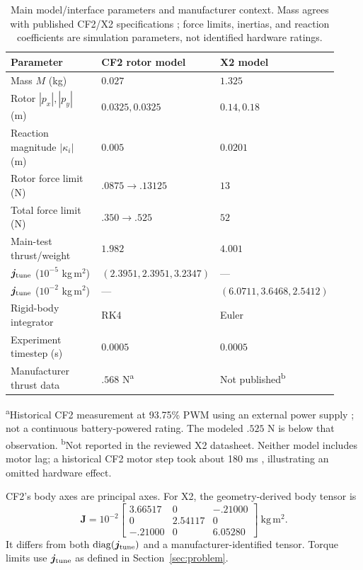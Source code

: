 \documentclass[letterpaper, 10 pt, conference]{ieeeconf}
\begin{document}
\begin{table}[t]
\centering
\caption{Main model/interface parameters and manufacturer context.
Mass agrees with published CF2/X2 specifications \cite{bitcrazeCF20Specs,skydioX2ESpecs}; force limits, inertias, and reaction coefficients are simulation parameters, not identified hardware ratings.}
\label{tab:models}
\setlength{\tabcolsep}{3pt}
\footnotesize
\begin{tabular}{@{}p{0.40\linewidth}p{0.27\linewidth}p{0.25\linewidth}@{}}
\toprule
Parameter & CF2 rotor model & X2 model\\
\midrule
Mass $M$ (kg) & $0.027$ & $1.325$\\
Rotor $|p_x|,|p_y|$ (m) & $0.0325,0.0325$ & $0.14,0.18$\\
Reaction magnitude $|\kappa_i|$ (m) & $0.005$ & $0.0201$\\
Rotor force limit (N) & $.0875\to.13125$ & $13$\\
Total force limit (N) & $.350\to.525$ & $52$\\
Main-test thrust/weight & $1.982$ & $4.001$\\
$\bm j_{\rm tune}$ ($10^{-5}$ kg\,m$^2$) & $(2.3951,\allowbreak2.3951,\allowbreak3.2347)$ & ---\\
$\bm j_{\rm tune}$ ($10^{-2}$ kg\,m$^2$) & --- & $(6.0711,\allowbreak3.6468,\allowbreak2.5412)$\\
Rigid-body integrator & RK4 & Euler\\
Experiment timestep (s) & $0.0005$ & $0.0005$\\
Manufacturer thrust data & $.568$ N\textsuperscript{a} & Not published\textsuperscript{b}\\
\bottomrule
\end{tabular}
\par\smallskip
\begin{minipage}{0.97\linewidth}
\scriptsize
\textsuperscript{a}Historical CF2 measurement at 93.75\% PWM using an external power supply \cite{bitcrazeThrustMeasurements}; not a continuous battery-powered rating. The modeled $.525$ N is below that observation.
\textsuperscript{b}Not reported in the reviewed X2 datasheet. Neither model includes motor lag; a historical CF2 motor step took about 180 ms \cite{bitcrazeMotorResponse}, illustrating an omitted hardware effect.
\end{minipage}
\end{table}

CF2's body axes are principal axes. For X2, the geometry-derived body tensor is
\[
 \bm J=10^{-2}\begin{bmatrix}3.66517&0&-.21000\\0&2.54117&0\\-.21000&0&6.05280\end{bmatrix}
 \ \mathrm{kg\,m^2}.
\]
It differs from both $\operatorname{diag}(\bm j_{\rm tune})$ and a
manufacturer-identified tensor. Torque limits use $\bm j_{\rm tune}$ as
defined in Section~\ref{sec:problem}.
\end{document}
